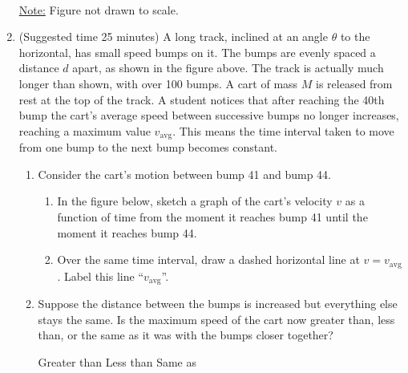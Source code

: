 \documentclass{../../../oss-apphys}
\begin{document}
\begin{enumerate}[leftmargin=15pt]
  \begin{center}
    \\
    \underline{Note:} Figure not drawn to scale.
  \end{center}
\item (Suggested time 25 minutes) A long track, inclined at an angle $\theta$
  to the horizontal, has small speed bumps on it. The bumps are evenly spaced a
  distance $d$ apart, as shown in the figure above. The track is actually much
  longer than shown, with over 100 bumps. A cart of mass $M$ is released from
  rest at the top of the track. A student notices that after reaching the
  40th bump the cart's average speed between successive bumps no longer
  increases, reaching a maximum value $v_\mathrm{avg}$. This means the time
  interval taken to move from one bump to the next bump becomes constant.
  \begin{enumerate}[nosep]
  \item Consider the cart's motion between bump 41 and bump 44.
    \begin{enumerate}[nosep]
    \item In the figure below, sketch a graph of the cart's velocity $v$ as a
      function of time from the moment it reaches bump 41 until the moment it
      reaches bump 44.
    \item Over the same time interval, draw a dashed horizontal line at
      $v=v_\text{avg}$. Label this line ``$v_\text{avg}$''.
    \end{enumerate}
    \begin{center}
    \end{center}
  \item Suppose the distance between the bumps is increased but everything else
    stays the same. Is the maximum speed of the cart now greater than, less
    than, or the same as it was with the bumps closer together?

    \vspace{.2in}
    \underline{\hspace{.25in}} Greater than\hspace{.5in}
    \underline{\hspace{.25in}} Less than\hspace{.5in}
    \underline{\hspace{.25in}} Same as


\end{enumerate}
\end{enumerate}
\end{document}
